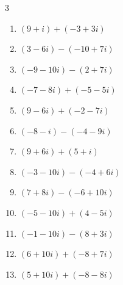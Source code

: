 \begin{multicols}{3}
\begin{enumerate}
  \item $\displaystyle (9+i) + (-3+3i)$

        \phantom{$\displaystyle =6+4i$}

  \item $\displaystyle (3-6i) - (-10+7i)$

        \phantom{$\displaystyle =13-13i$}

  \item $\displaystyle (-9-10i) - (2+7i)$

        \phantom{$\displaystyle =-11-17i$}

  \item $\displaystyle (-7-8i) + (-5-5i)$

        \phantom{$\displaystyle =-12-13i$}

  \item $\displaystyle (9-6i) + (-2-7i)$

        \phantom{$\displaystyle =7-13i$}

  \item $\displaystyle (-8-i) - (-4-9i)$

        \phantom{$\displaystyle =-4+8i$}

  \item $\displaystyle (9+6i) + (5+i)$

        \phantom{$\displaystyle =14+7i$}

  \item $\displaystyle (-3-10i) - (-4+6i)$

        \phantom{$\displaystyle =1-16i$}

  \item $\displaystyle (7+8i) - (-6+10i)$

        \phantom{$\displaystyle =13-2i$}

  \item $\displaystyle (-5-10i) + (4-5i)$

        \phantom{$\displaystyle =-1-15i$}

  \item $\displaystyle (-1-10i) - (8+3i)$

        \phantom{$\displaystyle =-9-13i$}

  \item $\displaystyle (6+10i) + (-8+7i)$

        \phantom{$\displaystyle =-2+17i$}

  \item $\displaystyle (5+10i) + (-8-8i)$

        \phantom{$\displaystyle =-3+2i$}


\end{enumerate}
\end{multicols}
